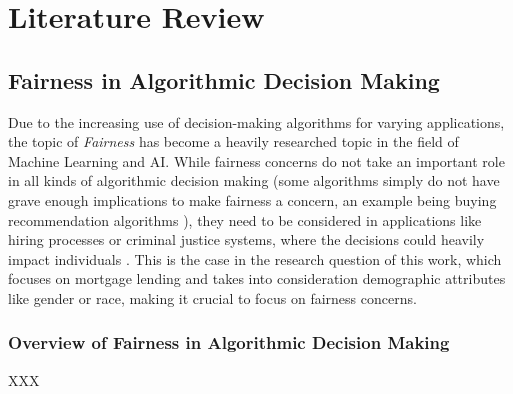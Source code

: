 \chapter{Literature Review}\label{chap:lit}

\section{Fairness in Algorithmic Decision Making}\label{sec:fairness}

Due to the increasing use of decision-making algorithms for varying applications, the topic of \textit{Fairness} has become a heavily researched topic in the field of Machine Learning and AI.\@
While fairness concerns do not take an important role in all kinds of algorithmic decision making (some algorithms simply do not have grave enough implications to make fairness a concern, an example being buying recommendation algorithms \parencite{Marcinkevics2023}), 
they need to be considered in applications like hiring processes or criminal justice systems, where the decisions could heavily impact individuals \parencite{Barocas2016}.
This is the case in the research question of this work, which focuses on mortgage lending and takes into consideration demographic attributes like gender or race, making it crucial to focus on fairness concerns.

\subsection{Overview of Fairness in Algorithmic Decision Making}\label{subsec:overview}

XXX

